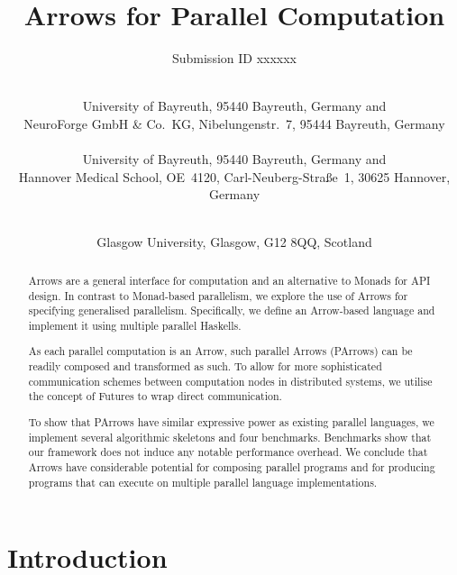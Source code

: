 \documentclass{jfp1}
\title{Arrows for Parallel Computation}
\author{Submission ID xxxxxx}
\author[M. Braun, O. Lobachev, and P. Trinder]%
        {\textls*{MARTIN BRAUN}\\
          University of Bayreuth, 95440 Bayreuth, Germany 
          and\\
          NeuroForge GmbH \& Co.\ KG,
          Nibelungenstr.~7,
          95444 Bayreuth,
          Germany\\
		 \textls*{OLEG LOBACHEV}\\
		 University of Bayreuth, 95440 Bayreuth, Germany 
                 and\\
                 Hannover Medical School, OE~4120, Carl-Neuberg-Straße~1, 30625 Hannover, Germany\\
		 \and\ \textls*{PHIL TRINDER}\\
		 Glasgow University, Glasgow, G12 8QQ, Scotland}
\newcommand{\citHughes}{\citep{HughesArrows}}
\newcommand{\comm}[2]{}
\newcommand{\olcomment}[1]{\comm{OL}{#1}}
\newcommand{\mbcomment}[1]{\comm{MB}{#1}}
\begin{document}
\label{firstpage}

\def\SymbReg{\textsuperscript{\textregistered}}

\maketitle

\begin{abstract}
Arrows are a general interface for computation and an alternative to Monads for API design. In contrast to Monad-based parallelism, we explore the use of Arrows for specifying generalised parallelism. Specifically, we define an Arrow-based language and implement it using multiple parallel Haskells.

As each parallel computation is an Arrow, such parallel Arrows (PArrows) can be readily composed and transformed as such.
To allow for more sophisticated communication schemes between computation nodes in distributed systems, we utilise the concept of Futures to wrap direct communication.

To show that PArrows have similar expressive power as existing parallel languages, we implement several algorithmic skeletons and four benchmarks. 
Benchmarks show that our framework does not induce any notable performance overhead. We conclude that Arrows have considerable potential for composing parallel programs and for producing programs that can execute on multiple parallel language implementations. 
%
%
\end{abstract}

\tableofcontents


\section{Introduction}
\label{sec:introduction}
\end{document}

